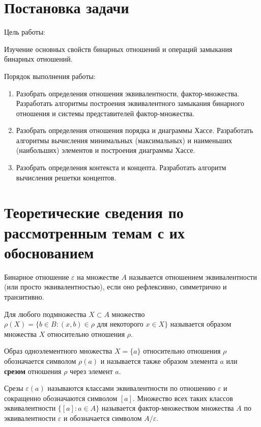 \documentclass[spec, och, labwork]{shiza}
\begin{document}
\tableofcontents

\section{Постановка задачи}

Цель работы:

Изучение основных свойств бинарных отношений и операций замыкания бинарных отношений.

Порядок выполнения работы:
    \begin{enumerate}
        \item Разобрать определения отношения эквивалентности, фактор-множества. Разработать алгоритмы построения 
        эквивалентного замыкания бинарного отношения и системы представителей фактор-множества.
        \item Разобрать определения отношения порядка и диаграммы Хассе. Разработать алгоритмы вычисления минимальных 
        (максимальных) и наименьших (наибольших) элементов  и построения диаграммы Хассе.
        \item Разобрать определения контекста и концепта. Разработать алгоритм вычисления решетки концептов.
    \end{enumerate}

\section{Теоретические сведения по рассмотренным темам с их обоснованием}

Бинарное отношение $\varepsilon$ на множестве $A$ называется отношением эквивалентности (или просто эквивалентностью), если оно рефлексивно, симметрично и транзитивно.

Для любого подмножества $X \subset A$ множество $\rho(X) = \{b \in B: (x, b) \in \rho \text{ для некоторого } x \in X\}$ называется образом множества $X$ относительно отношения $\rho$.

Образ одноэлементного множества $X = \{a\}$ относительно отношения $\rho$ обозначается символом $\rho(a)$ и называется также образом элемента $a$ или \textbf{срезом} отношения $\rho$ через элемент $a$. 

Срезы $\varepsilon(a)$ называются классами эквивалентности по отношению $\varepsilon$ и сокращенно обозначаются символом $[a]$. Множество всех таких классов эквивалентности $\{[a]: a \in A\}$ называется фактор-множеством множества $A$ по эквивалентности $\varepsilon$ и обозначается символом $A/\varepsilon$.
\end{document}
